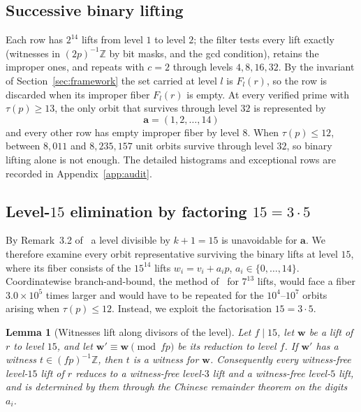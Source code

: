 \documentclass[11pt]{article}
\newtheorem{lemma}[theorem]{Lemma}
\theoremstyle{definition}
\theoremstyle{remark}
\newcommand{\Z}{\mathbb{Z}}
\newcommand{\vct}[1]{\mathbf{#1}}
\begin{document}
\subsection{Successive binary lifting}

Each row has $2^{14}$ lifts from level $1$ to level $2$; the filter tests
every lift exactly (witnesses in $(2p)^{-1}\Z$ by bit masks, and the gcd
condition), retains the improper ones, and repeats with $c=2$ through
levels $4,8,16,32$.  By the invariant of Section~\ref{sec:framework} the
set carried at level $l$ is $F_l(r)$, so the row is discarded when its
improper fiber $F_l(r)$ is empty.  At every verified prime with
$\tau(p)\geq13$, the only orbit that survives through level $32$ is
represented by
\[
  \vct{a}=(1,2,\ldots,14)
\]
and every other row has empty improper fiber by level $8$.  When
$\tau(p)\leq12$, between $8{,}011$ and $8{,}235{,}157$ unit orbits survive
through level $32$, so binary lifting alone is not enough.  The detailed
histograms and exceptional rows are recorded in Appendix~\ref{app:audit}.

\subsection{\texorpdfstring{Level-$15$ elimination by factoring
$15=3\cdot5$}{Level-15 elimination by factoring 15=3*5}}

By Remark~3.2 of~\cite{ST26} a level divisible by $k+1=15$ is unavoidable
for $\vct{a}$.  We therefore examine every orbit representative surviving
the binary lifts at level $15$, where its fiber consists of the $15^{14}$ lifts
$w_i=v_i+a_ip$, $a_i\in\{0,\ldots,14\}$.  Coordinatewise branch-and-bound,
the method of~\cite{Allikvere26} for $7^{13}$ lifts, would face a fiber
$3.0\times10^5$ times larger and would have to be repeated for the
$10^4$--$10^7$
orbits arising when $\tau(p)\leq12$.  Instead, we exploit the
factorisation $15=3\cdot5$.

\begin{lemma}[Witnesses lift along divisors of the level]\label{lem:factor}
Let $f\mid15$, let $\vct{w}$ be a lift of $r$ to level $15$, and let
$\vct{w}'\equiv\vct{w}\pmod{fp}$ be its reduction to level $f$.  If
$\vct{w}'$ has a witness $t\in(fp)^{-1}\Z$, then $t$ is a witness for
$\vct{w}$.  Consequently every witness-free level-$15$ lift of $r$
reduces to a witness-free level-$3$ lift and a witness-free level-$5$
lift, and is determined by them through the Chinese remainder theorem on
the digits $a_i$.
\end{lemma}
\end{document}
